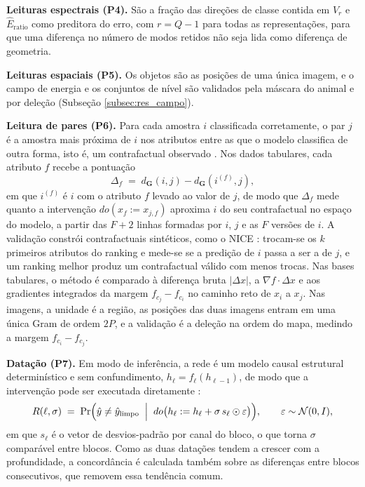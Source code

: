 \textbf{Leituras espectrais (P4).} São a fração das direções de classe contida em $V_r$ e $\widehat{E}_{\mathrm{ratio}}$ como preditora do erro, com $r = Q-1$ para todas as representações, para que uma diferença no número de modos retidos não seja lida como diferença de geometria.

\textbf{Leituras espaciais (P5).} Os objetos são as posições de uma única imagem, e o campo de energia e os conjuntos de nível são validados pela máscara do animal e por deleção (Subseção \ref{subsec:res_campo}).

\textbf{Leitura de pares (P6).} Para cada amostra $i$ classificada corretamente, o par $j$ é a amostra mais próxima de $i$ nos atributos entre as que o modelo classifica de outra forma, isto é, um contrafactual observado \citep{KeaneSmyth2020}. Nos dados tabulares, cada atributo $f$ recebe a pontuação
\begin{equation}\label{eq:delta_d}
    \Delta_f \;=\; d_{\mathbf{G}}(i,j) - d_{\mathbf{G}}(i^{(f)},j),
\end{equation}
em que $i^{(f)}$ é $i$ com o atributo $f$ levado ao valor de $j$, de modo que $\Delta_f$ mede quanto a intervenção $do(x_f := x_{j,f})$ aproxima $i$ do seu contrafactual no espaço do modelo, a partir das $F + 2$ linhas formadas por $i$, $j$ e as $F$ versões de $i$. A validação constrói contrafactuais sintéticos, como o NICE \citep{Brughmans2024}: trocam-se os $k$ primeiros atributos do ranking e mede-se se a predição de $i$ passa a ser a de $j$, e um ranking melhor produz um contrafactual válido com menos trocas. Nas bases tabulares, o método é comparado à diferença bruta $|\Delta x|$, a $\nabla f\cdot\Delta x$ e aos gradientes integrados \citep{Sundararajan2017} da margem $f_{c_j}-f_{c_i}$ no caminho reto de $x_i$ a $x_j$. Nas imagens, a unidade é a região, as posições das duas imagens entram em uma única Gram de ordem $2P$, e a validação é a deleção na ordem do mapa, medindo a margem $f_{c_i} - f_{c_j}$.

\textbf{Datação (P7).} Em modo de inferência, a rede é um modelo causal estrutural determinístico e sem confundimento, $h_\ell = f_\ell(h_{\ell-1})$, de modo que a intervenção pode ser executada diretamente \citep{Pearl2009}:
\begin{equation}\label{eq:intervencao}
    R(\ell,\sigma) \;=\; \Pr\Bigl(\hat{y} \neq \hat{y}_{\text{limpo}}
    \;\Bigm|\; do\bigl(h_\ell := h_\ell + \sigma\,s_\ell \odot \varepsilon\bigr)\Bigr),
    \qquad \varepsilon \sim \mathcal{N}(0, I),
\end{equation}
em que $s_\ell$ é o vetor de desvios-padrão por canal do bloco, o que torna $\sigma$ comparável entre blocos. Como as duas datações tendem a crescer com a profundidade, a concordância é calculada também sobre as diferenças entre blocos consecutivos, que removem essa tendência comum.

